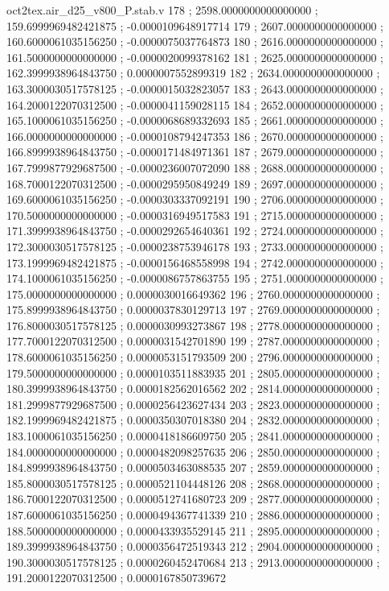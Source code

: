 \begin{filecontents}[overwrite]{oct2tex.air_d25_v800_P.stab.v}
178 ; 2598.0000000000000000 ; 159.6999969482421875 ; -0.0000109648917714
179 ; 2607.0000000000000000 ; 160.6000061035156250 ; -0.0000075037764873
180 ; 2616.0000000000000000 ; 161.5000000000000000 ; -0.0000020099378162
181 ; 2625.0000000000000000 ; 162.3999938964843750 ; 0.0000007552899319
182 ; 2634.0000000000000000 ; 163.3000030517578125 ; -0.0000015032823057
183 ; 2643.0000000000000000 ; 164.2000122070312500 ; -0.0000041159028115
184 ; 2652.0000000000000000 ; 165.1000061035156250 ; -0.0000068689332693
185 ; 2661.0000000000000000 ; 166.0000000000000000 ; -0.0000108794247353
186 ; 2670.0000000000000000 ; 166.8999938964843750 ; -0.0000171484971361
187 ; 2679.0000000000000000 ; 167.7999877929687500 ; -0.0000236007072090
188 ; 2688.0000000000000000 ; 168.7000122070312500 ; -0.0000295950849249
189 ; 2697.0000000000000000 ; 169.6000061035156250 ; -0.0000303337092191
190 ; 2706.0000000000000000 ; 170.5000000000000000 ; -0.0000316949517583
191 ; 2715.0000000000000000 ; 171.3999938964843750 ; -0.0000292654640361
192 ; 2724.0000000000000000 ; 172.3000030517578125 ; -0.0000238753946178
193 ; 2733.0000000000000000 ; 173.1999969482421875 ; -0.0000156468558998
194 ; 2742.0000000000000000 ; 174.1000061035156250 ; -0.0000086757863755
195 ; 2751.0000000000000000 ; 175.0000000000000000 ; 0.0000030016649362
196 ; 2760.0000000000000000 ; 175.8999938964843750 ; 0.0000037830129713
197 ; 2769.0000000000000000 ; 176.8000030517578125 ; 0.0000030993273867
198 ; 2778.0000000000000000 ; 177.7000122070312500 ; 0.0000031542701890
199 ; 2787.0000000000000000 ; 178.6000061035156250 ; 0.0000053151793509
200 ; 2796.0000000000000000 ; 179.5000000000000000 ; 0.0000103511883935
201 ; 2805.0000000000000000 ; 180.3999938964843750 ; 0.0000182562016562
202 ; 2814.0000000000000000 ; 181.2999877929687500 ; 0.0000256423627434
203 ; 2823.0000000000000000 ; 182.1999969482421875 ; 0.0000350307018380
204 ; 2832.0000000000000000 ; 183.1000061035156250 ; 0.0000418186609750
205 ; 2841.0000000000000000 ; 184.0000000000000000 ; 0.0000482098257635
206 ; 2850.0000000000000000 ; 184.8999938964843750 ; 0.0000503463088535
207 ; 2859.0000000000000000 ; 185.8000030517578125 ; 0.0000521104448126
208 ; 2868.0000000000000000 ; 186.7000122070312500 ; 0.0000512741680723
209 ; 2877.0000000000000000 ; 187.6000061035156250 ; 0.0000494367741339
210 ; 2886.0000000000000000 ; 188.5000000000000000 ; 0.0000433935529145
211 ; 2895.0000000000000000 ; 189.3999938964843750 ; 0.0000356472519343
212 ; 2904.0000000000000000 ; 190.3000030517578125 ; 0.0000260452470684
213 ; 2913.0000000000000000 ; 191.2000122070312500 ; 0.0000167850739672

\end{filecontents}
